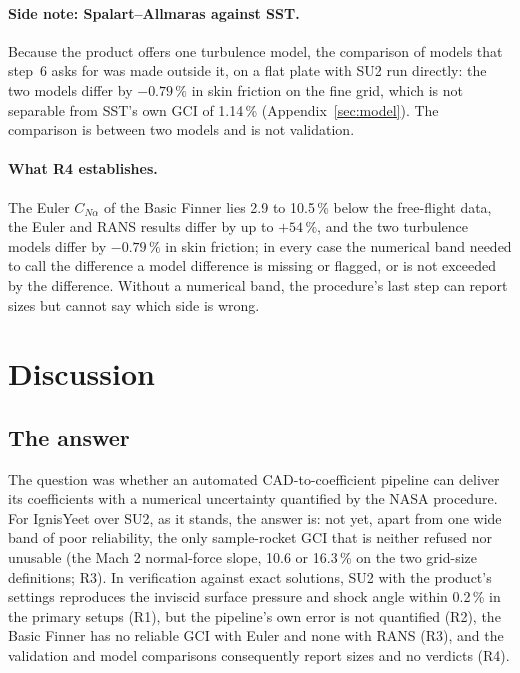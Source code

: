\documentclass[twocolumn]{labreport}
\newcommand{\CNa}{C_{N\alpha}}
\begin{document}
\paragraph{Side note: Spalart--Allmaras against SST.}
Because the product offers one turbulence model, the comparison of models that step~6 asks for was made outside it, on a flat plate with SU2 run directly: the two models differ by $-0.79\,\%$ in skin friction on the fine grid, which is not separable from SST's own GCI of 1.14\,\% (Appendix~\ref{sec:model}).
The comparison is between two models and is not validation.

\paragraph{What R4 establishes.}
The Euler $\CNa$ of the Basic Finner lies 2.9 to 10.5\,\% below the free-flight data, the Euler and RANS results differ by up to $+54\,\%$, and the two turbulence models differ by $-0.79\,\%$ in skin friction; in every case the numerical band needed to call the difference a model difference is missing or flagged, or is not exceeded by the difference.
Without a numerical band, the procedure's last step can report sizes but cannot say which side is wrong.

\section{Discussion}
\label{sec:discussion}

\subsection{The answer}
\label{sec:answer}

The question was whether an automated CAD-to-coefficient pipeline can deliver its coefficients with a numerical uncertainty quantified by the NASA procedure.
For IgnisYeet over SU2, as it stands, the answer is: not yet, apart from one wide band of poor reliability, the only sample-rocket GCI that is neither refused nor unusable (the Mach 2 normal-force slope, 10.6 or 16.3\,\% on the two grid-size definitions; R3).
In verification against exact solutions, SU2 with the product's settings reproduces the inviscid surface pressure and shock angle within 0.2\,\% in the primary setups (R1), but the pipeline's own error is not quantified (R2), the Basic Finner has no reliable GCI with Euler and none with RANS (R3), and the validation and model comparisons consequently report sizes and no verdicts (R4).
\end{document}
